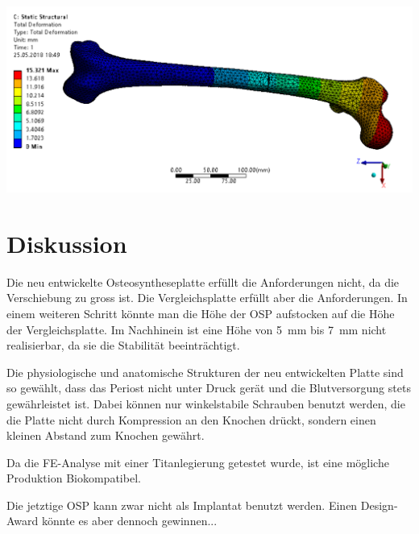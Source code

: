 			\begin{Figure}
				\centering
				\includegraphics[width=15cm]{content/images/plausibility.png}
				\label{fig:plausibility}
			\end{Figure}

\newpage
\section{Diskussion}

	Die neu entwickelte Osteosyntheseplatte erfüllt die Anforderungen nicht, da die Verschiebung zu gross ist.
	Die Vergleichsplatte erfüllt aber die Anforderungen. In einem weiteren Schritt könnte man die Höhe der OSP
	aufstocken auf die Höhe der Vergleichsplatte. Im Nachhinein ist eine Höhe von \SI{5}{mm} bis \SI{7}{mm}
	nicht realisierbar, da sie die Stabilität beeinträchtigt.
	
	Die physiologische und anatomische Strukturen der neu entwickelten Platte sind so gewählt, dass das
	Periost nicht unter Druck gerät und die Blutversorgung stets gewährleistet ist. Dabei können nur
	winkelstabile Schrauben benutzt werden, die die Platte nicht durch Kompression an den Knochen drückt,
	sondern einen kleinen Abstand zum Knochen gewährt.
	
	Da die FE-Analyse mit einer Titanlegierung getestet wurde, ist eine mögliche Produktion Biokompatibel. 
	
	Die jetztige OSP kann zwar nicht als Implantat benutzt werden. Einen Design-Award könnte es aber dennoch
	gewinnen...
	
	


